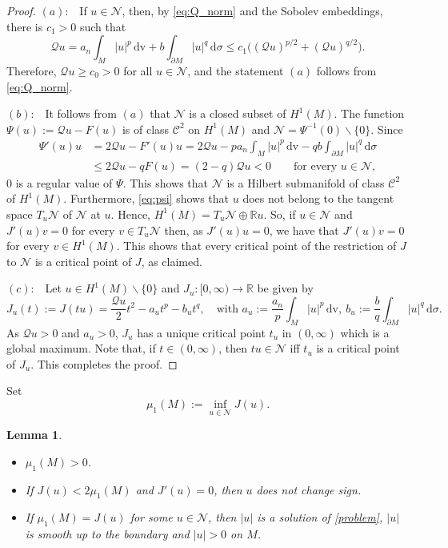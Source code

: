 \documentclass[reqno,11pt,oneside]{amsart}
\newtheorem{lemma}[theorem]{Lemma}
\numberwithin{equation}{section}
\def\r{\mathbb{R}}
\def\im{\int_{M}}
\def\idm{\int_{\partial M}}
\def\cC{\mathcal{C}}
\def\cN{\mathcal{N}}
\def\d{\,\mathrm{d}}
\def\dv{\,\mathrm{dv}}
\begin{document}
\begin{proof}
$(a):$ \ If $u\in\cN$, then, by \eqref{eq:Q_norm} and the Sobolev embeddings, there is $c_1>0$ such that
$$\mathscr{Q}u=a_n\im |u|^p \dv + b\idm|u|^q\d\sigma\leq c_1\Big((\mathscr{Q}u)^{p/2}+(\mathscr{Q}u)^{q/2}\Big).$$
Therefore, $\mathscr{Q}u\geq c_0>0$ for all $u\in\cN$, and the statement $(a)$ follows from \eqref{eq:Q_norm}.

$(b):$ \ It follows from $(a)$ that $\cN$ is a closed subset of $H^1(M)$. The function $\Psi(u):=\mathscr{Q} u-F(u)$ is of class $\cC^2$ on $H^1(M)$ and $\cN=\Psi^{-1}(0)\smallsetminus\{0\}$. Since
\begin{align}\label{eq:psi}
\Psi'(u)u&=2\mathscr{Q}u-F'(u)u=2\mathscr{Q}u-pa_n\im |u|^p\dv-qb\idm |u|^q\d \sigma \nonumber\\
&\leq 2\mathscr{Q}u-qF(u) =(2-q)\mathscr{Q}u<0\qquad\text{for every \ }u\in\cN,
\end{align}
$0$ is a regular value of $\Psi$. This shows that $\cN$ is a Hilbert submanifold of class $\cC^2$ of $H^1(M)$. Furthermore, \eqref{eq:psi} shows that $u$ does not belong to the tangent space $T_u\cN$ of $\cN$ at $u$. Hence, $H^1(M)=T_u\cN\oplus\r u$. So, if $u\in\cN$ and $J'(u)v=0$ for every $v\in T_u\cN$ then, as $J'(u)u=0$, we have that $J'(u)v=0$ for every $v\in H^1(M)$. This shows that every critical point of the restriction of $J$ to $\cN$ is a critical point of $J$, as claimed.

$(c):$ \ Let $u\in H^1(M)\smallsetminus\{0\}$ and $J_u:[0,\infty)\to\r$ be given by
$$J_u(t):=J(tu)=\frac{\mathscr{Q}u}{2} t^2- a_ut^p-b_ut^q,\quad\text{with \ }a_u:=\frac{a_n}{p}\im|u|^p\dv, \ b_u:=\frac{b}{q}\idm|u|^q\d\sigma.$$
As $\mathscr{Q}u>0$ and $a_u>0$, $J_u$ has a unique critical point $t_u$ in $(0,\infty)$ which is a global maximum. Note that, if $t\in(0,\infty)$, then $tu\in\cN$ iff $t_u$ is a critical point of $J_u$. This completes the proof.
\end{proof}

Set
$$\mu_1(M):=\inf_{u\in\cN}J(u).$$

\begin{lemma}\label{lem:positive}
\begin{itemize}
\item[$(i)$]$\mu_1(M)>0$.
\item[$(ii)$]If $J(u)<2\mu_1(M)$ and $J'(u)=0$, then $u$ does not change sign.
\item[$(iii)$]If $\mu_1(M)=J(u)$ for some $u\in\cN$, then $|u|$ is a solution of \eqref{problem}, $|u|$ is smooth up to the boundary and $|u|>0$ on $M$. 
\end{itemize}
\end{lemma}
\end{document}

